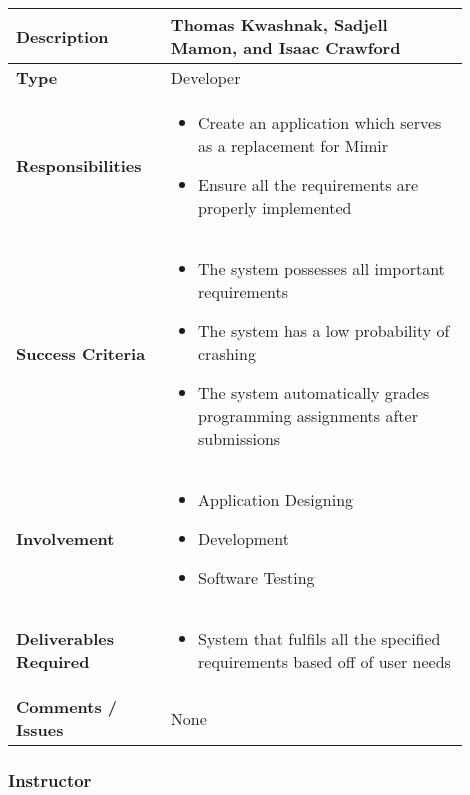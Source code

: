 \documentclass{article}
\begin{document}
\begin{tabular}{| p{0.3\linewidth} | p{0.6\linewidth} |}
  \hline
  \textbf{Description}& Thomas Kwashnak, Sadjell Mamon, and Isaac Crawford\\
  \hline
  \textbf{Type} & Developer\\
  \hline
  \textbf{Responsibilities} & \begin{itemize}
    \item Create an application which serves as a replacement for Mimir
    \item Ensure all the requirements are properly implemented
  \end{itemize} \\
  \hline
  \textbf{Success Criteria}& \begin{itemize}
    \item The system possesses all important requirements
    \item The system has a low probability of crashing
    \item The system automatically grades programming assignments after submissions
  \end{itemize}\\
  \hline
  \textbf{Involvement} & \begin{itemize}
    \item Application Designing
    \item Development
    \item Software Testing
  \end{itemize} \\
  \hline
  \textbf{Deliverables Required}& \begin{itemize}
    \item System that fulfils all the specified requirements based off of user needs
  \end{itemize} \\
  \hline
  \textbf{Comments / Issues} & None \\
  \hline
\end{tabular}

\subsubsection{Instructor}
\end{document}
